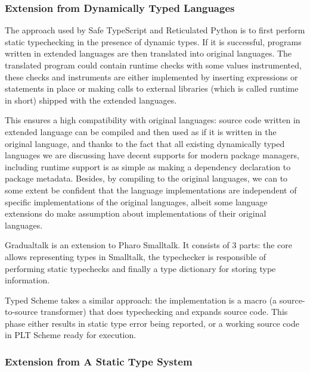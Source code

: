 \subsubsection{Extension from Dynamically Typed Languages}

The approach used by Safe TypeScript and Reticulated Python
is to first perform static typechecking in the presence of dynamic types.
If it is successful, programs written in extended languages are then translated into original languages.
The translated program could contain runtime checks with some values instrumented,
these checks and instruments are either implemented by inserting expressions or statements in place or
making calls to external libraries (which is called runtime in short) shipped with
the extended languages.

This ensures a high compatibility with original languages: source code written in extended language
can be compiled and then used as if it is written in the original language, and thanks to the fact
that all existing dynamically typed languages
we are discussing have decent supports for modern package managers,
including runtime support is as simple as making a dependency declaration to package metadata.
Besides, by compiling to the original languages,
we can to some extent be confident that the language implementations
are independent of specific implementations of the original languages,
albeit some language extensions do make assumption about implementations of their original languages.



Gradualtalk is an extension to Pharo Smalltalk. It consists of 3 parts:
the core allows representing types in Smalltalk, the typechecker
is responsible of performing static typechecks and finally
a type dictionary for storing type information.

Typed Scheme takes a similar approach: the implementation is a macro
(a source-to-source transformer) that does typechecking and expands source code.
This phase either results in static type error being reported,
or a working source code in PLT Scheme ready for execution.

\subsubsection{Extension from A Static Type System}

